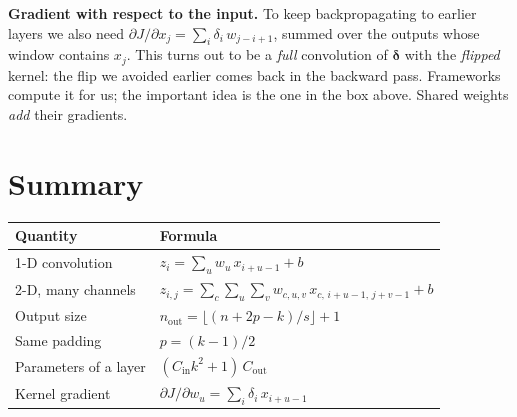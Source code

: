 \documentclass[12pt, a4paper]{article}
\providecommand{\bdelta}{\boldsymbol{\delta}}
\begin{document}
\begin{notebox}
  \textbf{Gradient with respect to the input.}
  To keep backpropagating to earlier layers we also need
  $\partial J / \partial x_j = \sum_i \delta_i\, w_{j-i+1}$, summed over the
  outputs whose window contains $x_j$. This turns out to be a \emph{full}
  convolution of $\bdelta$ with the \emph{flipped} kernel: the flip we
  avoided earlier comes back in the backward pass. Frameworks compute it for
  us; the important idea is the one in the box above. Shared weights
  \emph{add} their gradients.
\end{notebox}

\section{Summary}

\begin{center}
  \renewcommand{\arraystretch}{1.5}
  \begin{tabular}{ll}
    \toprule
    Quantity               & Formula                                                                                \\
    \midrule
    1-D convolution        & $z_i = \sum_{u} w_u\, x_{i+u-1} + b$                                                   \\
    2-D, many channels     & $z_{i,j} = \sum_{c}\sum_{u}\sum_{v} w_{c,u,v}\, x_{c,\,i+u-1,\,j+v-1} + b$              \\
    Output size            & $n_{\text{out}} = \lfloor (n + 2p - k)/s \rfloor + 1$                                 \\
    Same padding           & $p = (k-1)/2$                                                                          \\
    Parameters of a layer  & $(C_{\text{in}} k^2 + 1)\, C_{\text{out}}$                                             \\
    Kernel gradient        & $\partial J / \partial w_u = \sum_i \delta_i\, x_{i+u-1}$                              \\
    \bottomrule
  \end{tabular}
\end{center}
\end{document}
